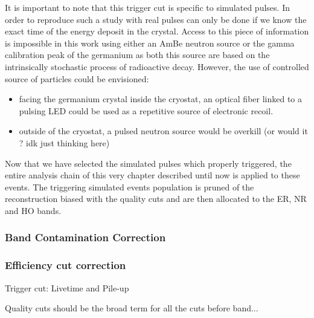 It is important to note that this trigger cut is specific to simulated pulses. In order to reproduce such a study with real pulses can only be done if we know the exact time of the energy deposit in the crystal. Access to this piece of information is impossible in this work using either an AmBe neutron source or the gamma calibration peak of the germanium as both this source are based on the intrinsically stochastic process of radioactive decay. However, the use of controlled source of particles could be envisioned:
\begin{itemize}
	\item facing the germanium crystal inside the cryostat, an optical fiber linked to a pulsing LED could be used as a repetitive source of electronic recoil.
	\item outside of the cryostat, a pulsed neutron source would be overkill (or would it ? idk just thinking here)
\end{itemize}

Now that we have selected the simulated pulses which properly triggered, the entire analysis chain of this very chapter \label{ChapterNeutron} described until now is applied to these events. The triggering simulated events population is pruned of the reconstruction biased with the quality cuts and are then allocated to the ER, NR and HO bands.

\subsubsection{Band Contamination Correction}

\subsubsection{Efficiency cut correction}

Trigger cut: Livetime and Pile-up

Quality cuts should be the broad term for all the cuts before band...







